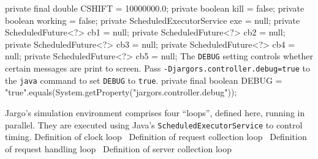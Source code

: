 \nwenddocs{}\plusendmoddef
private final double CSHIFT = 10000000.0;
private boolean kill = false;
private boolean working = false;
private ScheduledExecutorService exe = null;
private ScheduledFuture<?> cb1 = null;
private ScheduledFuture<?> cb2 = null;
private ScheduledFuture<?> cb3 = null;
private ScheduledFuture<?> cb4 = null;
private ScheduledFuture<?> cb5 = null;
\nwendcode{}\nwdocspar
The {\tt{}DEBUG} setting controls whether certain messages are print to screen.
Pass {\tt{}-Djargors.controller.debug=true} to the {\tt{}java} command to set
{\tt{}DEBUG} to {\tt{}true}.
\nwenddocs{}\plusendmoddef
private final boolean DEBUG =
    "true".equals(System.getProperty("jargors.controller.debug"));
\nwendcode{}\nwdocspar

 Jargo's simulation environment comprises four ``loops'', defined
here, running in parallel. They are executed using Java's
{\tt{}ScheduledExecutorService} to control timing.
\nwenddocs{}\endmoddef{}
\LA{}Definition of clock loop~{\nwtagstyle{}}\RA{}
\LA{}Definition of request collection loop~{\nwtagstyle{}}\RA{}
\LA{}Definition of request handling loop~{\nwtagstyle{}}\RA{}
\LA{}Definition of server collection loop~{\nwtagstyle{}}\RA{}
\nwendcode{}\nwdocspar

